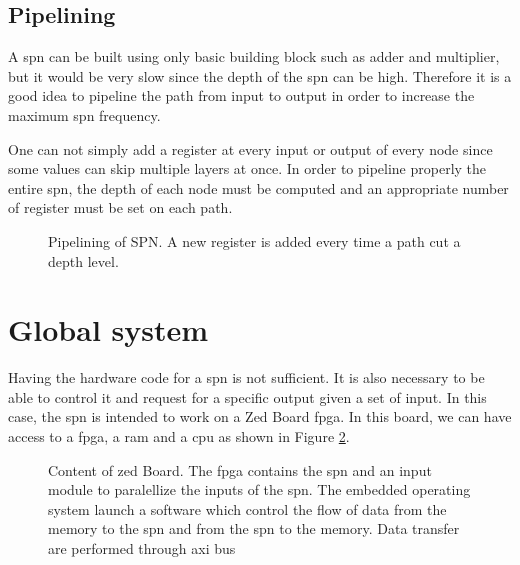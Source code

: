 \subsection{Pipelining}
A \gls{spn} can be built using only basic building block such as adder and multiplier, but it would be very slow since the depth of the \gls{spn} can be high. Therefore it is a good idea to pipeline the path from input to output in order to increase the maximum \gls{spn} frequency.

One can not simply add a register at every input or output of every node since some values can skip multiple layers at once. In order to pipeline properly the entire \gls{spn}, the depth of each node must be computed and an appropriate number of register must be set on each path.

\begin{figure}[!ht]
\begin{mdframed}
	\centering
	
	\caption{Pipelining of SPN. A new register is added every time a path cut a depth level.}
	\label{fig:pip}
\end{mdframed}
\end{figure}

\section{Global system}
Having the hardware code for a \gls{spn} is not sufficient. It is also necessary to be able to control it and request for a specific output given a set of input. In this case, the \gls{spn} is intended to work on a Zed Board \gls{fpga}. In this board, we can have access to a \gls{fpga}, a \gls{ram} and a \gls{cpu} as shown in Figure \ref{fig:glob_workflow}.

\begin{figure}[!ht]
\begin{mdframed}
	\centering
	
	\caption{Content of zed Board. The \gls{fpga} contains the \gls{spn} and an input module to paralellize the inputs of the \gls{spn}. The embedded operating system launch a software which control the flow of data from the memory to the \gls{spn} and from the \gls{spn} to the memory. Data transfer are performed through \gls{axi} bus  }
	\label{fig:glob_workflow}
\end{mdframed}
\end{figure}

